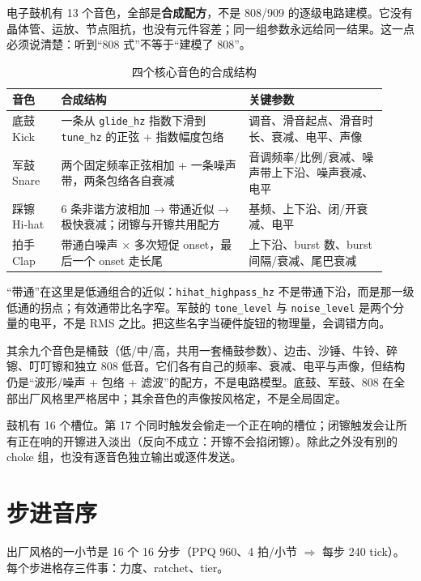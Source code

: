 电子鼓机有 13 个音色，全部是\textbf{合成配方}，不是 808/909 的逐级电路建模。它没有晶体管、运放、节点阻抗，也没有元件容差；同一组参数永远给同一结果。这一点必须说清楚：听到“808 式”不等于“建模了 808”。

\begin{table}[htbp]
\centering
\small
\begin{tabular}{@{}p{0.12\linewidth}p{0.46\linewidth}p{0.34\linewidth}@{}}
\hline
音色 & 合成结构 & 关键参数 \\
\hline
底鼓 Kick & 一条从 \texttt{glide\_hz} 指数下滑到 \texttt{tune\_hz} 的正弦 + 指数幅度包络 & 调音、滑音起点、滑音时长、衰减、电平、声像 \\
军鼓 Snare & 两个固定频率正弦相加 + 一条噪声带，两条包络各自衰减 & 音调频率/比例/衰减、噪声带上下沿、噪声衰减、电平 \\
踩镲 Hi-hat & 6 条非谐方波相加 → 带通近似 → 极快衰减；闭镲与开镲共用配方 & 基频、上下沿、闭/开衰减、电平 \\
拍手 Clap & 带通白噪声 × 多次短促 onset，最后一个 onset 走长尾 & 上下沿、burst 数、burst 间隔/衰减、尾巴衰减 \\
\hline
\end{tabular}
\caption{四个核心音色的合成结构}
\label{tab:drum-core-voices}
\end{table}

“带通”在这里是低通组合的近似：\texttt{hihat\_highpass\_hz} 不是带通下沿，而是那一级低通的拐点；有效通带比名字窄。军鼓的 \texttt{tone\_level} 与 \texttt{noise\_level} 是两个分量的电平，不是 RMS 之比。把这些名字当硬件旋钮的物理量，会调错方向。

其余九个音色是桶鼓（低/中/高，共用一套桶鼓参数）、边击、沙锤、牛铃、碎镲、叮叮镲和独立 808 低音。它们各有自己的频率、衰减、电平与声像，但结构仍是“波形/噪声 + 包络 + 滤波”的配方，不是电路模型。底鼓、军鼓、808 在全部出厂风格里严格居中；其余音色的声像按风格定，不是全局固定。

鼓机有 16 个槽位。第 17 个同时触发会偷走一个正在响的槽位；闭镲触发会让所有正在响的开镲进入淡出（反向不成立：开镲不会掐闭镲）。除此之外没有别的 choke 组，也没有逐音色独立输出或逐件发送。

\section{步进音序}

出厂风格的一小节是 16 个 16 分步（PPQ 960、4 拍/小节 $\Rightarrow$ 每步 240 tick）。每个步进格存三件事：力度、ratchet、tier。

\begin{center}
\end{center}

